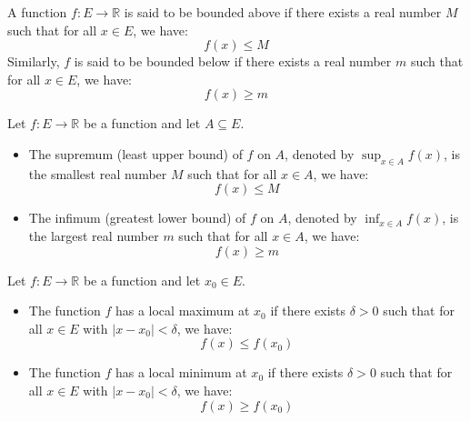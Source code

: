 \begin{definition}
    A function $f : E \to \mathbb{R}$ is said to be bounded above if there exists a real number $M$ such that for all $x \in E$, we have:
    \[
        f(x) \leq M
    \]
    Similarly, $f$ is said to be bounded below if there exists a real number $m$ such that for all $x \in E$, we have:
    \[
        f(x) \geq m
    \]
\end{definition}
\begin{definition}
    Let $f : E \to \mathbb{R}$ be a function and let $A \subseteq E$.
    \begin{itemize}[itemsep=1pt,label=$\circ$]
        \item The supremum (least upper bound) of $f$ on $A$, denoted by $\sup_{x \in A} f(x)$, is the smallest real number $M$ such that for all $x \in A$, we have:
        \[
            f(x) \leq M
        \]
        \item The infimum (greatest lower bound) of $f$ on $A$, denoted by $\inf_{x \in A} f(x)$, is the largest real number $m$ such that for all $x \in A$, we have:
        \[
            f(x) \geq m
        \]
    \end{itemize}
\end{definition}

\begin{definition}
    Let $f : E \to \mathbb{R}$ be a function and let $x_0 \in E$.
    \begin{itemize}[itemsep=1pt,label=$\circ$]
        \item The function $f$ has a local maximum at $x_0$ if there exists $\delta > 0$ such that for all $x \in E$ with $|x - x_0| < \delta$, we have:
        \[
            f(x) \leq f(x_0)
        \]
        \item The function $f$ has a local minimum at $x_0$ if there exists $\delta > 0$ such that for all $x \in E$ with $|x - x_0| < \delta$, we have:
        \[
            f(x) \geq f(x_0)
        \]
    \end{itemize}
\end{definition}

